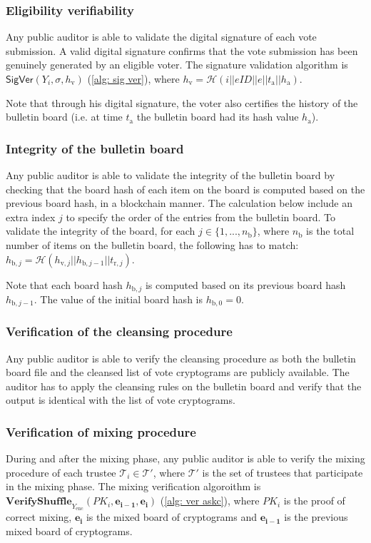  
\subsubsection{Eligibility verifiability}
Any public auditor is able to validate the digital signature of each vote submission. A valid digital signature confirms that the vote submission has been genuinely generated by an eligible voter. The signature validation algorithm is \( \mathsf{SigVer} (Y_i, \sigma, h_\mathrm{v}) \) (\cref{alg: sig ver}), where \( h_\mathrm{v} = \mathcal{H}( i || eID || e || t_\mathrm{a} || h_\mathrm{a}) \).

Note that through his digital signature, the voter also certifies the history of the bulletin board (i.e. at time $t_\mathrm{a}$ the bulletin board had its hash value $h_\mathrm{a}$).


\subsubsection{Integrity of the bulletin board}
Any public auditor is able to validate the integrity of the bulletin board by checking that the board hash of each item on the board is computed based on the previous board hash, in a blockchain manner. The calculation below include an extra index $j$ to specify the order of the entries from the bulletin board. To validate the integrity of the board, for each \( j \in \{ 1, ..., n_\mathrm{b} \} \), where $n_\mathrm{b}$ is the total number of items on the bulletin board, the following has to match: \( h_{\mathrm{b},j} = \mathcal{H}(h_{\mathrm{v},j} || h_{\mathrm{b},j-1} || t_{\mathrm{r},j}) \).

Note that each board hash $h_{\mathrm{b},j}$ is computed based on its previous board hash $h_{\mathrm{b},j-1}$. The value of the initial board hash is \( h_{\mathrm{b},0} = 0 \).


\subsubsection{Verification of the cleansing procedure}
Any public auditor is able to verify the cleansing procedure as both the bulletin board file and the cleansed list of vote cryptograms are publicly available. The auditor has to apply the cleansing rules on the bulletin board and verify that the output is identical with the list of vote cryptograms.


\subsubsection{Verification of mixing procedure}
During and after the mixing phase, any public auditor is able to verify the mixing procedure of each trustee $\mathcal{T}_i \in \boldsymbol{\mathcal{T}'}$, where $\boldsymbol{\mathcal{T}'}$ is the set of trustees that participate in the mixing phase. The mixing verification algoroithm is \( \mathbf{VerifyShuffle}_{Y_\mathrm{enc}} (PK_i, \boldsymbol{e_{i-1}}, \boldsymbol{e_i}) \) (\cref{alg: ver askc}), where $PK_i$ is the proof of correct mixing, $\boldsymbol{e_i}$ is the mixed board of cryptograms and $\boldsymbol{e_{i-1}}$ is the previous mixed board of cryptograms.

